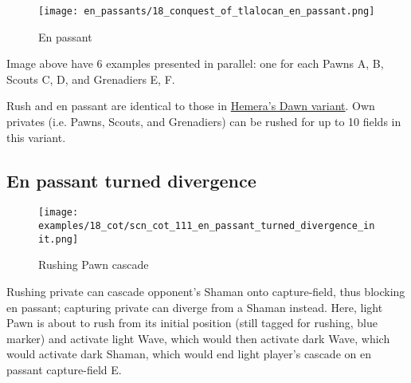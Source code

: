 \vspace*{-1.4\baselineskip}
\noindent
\begin{figure}[!h]
\texttt{[image: en\_passants/18\_conquest\_of\_tlalocan\_en\_passant.png]}
\vspace*{-1.3\baselineskip}
\caption{En passant}
\label{fig:18_conquest_of_tlalocan_en_passant}
\end{figure}

\vspace*{-0.5\baselineskip}
Image above have 6 examples presented in parallel: one for each Pawns A, B,
Scouts C, D, and Grenadiers E, F.

Rush and en passant are identical to those in
\hyperref[fig:14_hemera_s_dawn_en_passant]{Hemera's Dawn variant}.
Own privates (i.e. Pawns, Scouts, and Grenadiers) can be rushed for up to 10
fields in this variant.

\clearpage %

\subsection*{En passant turned divergence}
\label{sec:Conquest of Tlalocan/Rush, en passant/En passant turned divergence}

\vspace*{-0.7\baselineskip}
\noindent
\begin{wrapfigure}[12]{l}{0.4\textwidth}
\centering
\texttt{[image: examples/18\_cot/scn\_cot\_111\_en\_passant\_turned\_divergence\_init.png]}
\vspace*{-0.5\baselineskip}
\caption{Rushing Pawn cascade}
\label{fig:scn_cot_111_en_passant_turned_divergence_init}
\end{wrapfigure}
Rushing private can cascade opponent's Shaman onto capture-field, thus blocking
en passant; capturing private can diverge from a Shaman instead.\newline
\indent
Here, light Pawn is about to rush from its initial position (still tagged for
rushing, blue marker) and activate light Wave, which would then activate dark Wave,
which would activate dark Shaman, which would end light player's cascade on en
passant capture-field E.

